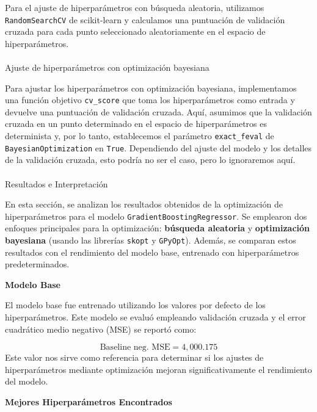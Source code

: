 \documentclass[
  12pt,
  letterpaper,
  DIV=11,
  numbers=noendperiod]{scrartcl}
\makeatletter
\let\oldparagraph\paragraph
\renewcommand{\paragraph}{
    \@ifstar
      \xxxParagraphStar
      \xxxParagraphNoStar
  }
\newcommand{\xxxParagraphStar}[1]{\oldparagraph*{#1}\mbox{}}
\newcommand{\xxxParagraphNoStar}[1]{\oldparagraph{#1}\mbox{}}
\makeatother
\begin{document}
Para el ajuste de hiperparámetros con búsqueda aleatoria, utilizamos
\texttt{RandomSearchCV} de scikit-learn y calculamos una puntuación de
validación cruzada para cada punto seleccionado aleatoriamente en el
espacio de hiperparámetros.

\paragraph{Ajuste de hiperparámetros con optimización
bayesiana}\label{ajuste-de-hiperparuxe1metros-con-optimizaciuxf3n-bayesiana}

Para ajustar los hiperparámetros con optimización bayesiana,
implementamos una función objetivo \texttt{cv\_score} que toma los
hiperparámetros como entrada y devuelve una puntuación de validación
cruzada. Aquí, asumimos que la validación cruzada en un punto
determinado en el espacio de hiperparámetros es determinista y, por lo
tanto, establecemos el parámetro \texttt{exact\_feval} de
\texttt{BayesianOptimization} en \texttt{True}. Dependiendo del ajuste
del modelo y los detalles de la validación cruzada, esto podría no ser
el caso, pero lo ignoraremos aquí.

\paragraph{Resultados e
Interpretación}\label{resultados-e-interpretaciuxf3n}

En esta sección, se analizan los resultados obtenidos de la optimización
de hiperparámetros para el modelo \texttt{GradientBoostingRegressor}. Se
emplearon dos enfoques principales para la optimización:
\textbf{búsqueda aleatoria} y \textbf{optimización bayesiana} (usando
las librerías \texttt{skopt} y \texttt{GPyOpt}). Además, se comparan
estos resultados con el rendimiento del modelo base, entrenado con
hiperparámetros predeterminados.

\textbf{Modelo Base}

El modelo base fue entrenado utilizando los valores por defecto de los
hiperparámetros. Este modelo se evaluó empleando validación cruzada y el
error cuadrático medio negativo (MSE) se reportó como:

\[
\text{Baseline neg. MSE} = 4,000.175
\] Este valor nos sirve como referencia para determinar si los ajustes
de hiperparámetros mediante optimización mejoran significativamente el
rendimiento del modelo.

\textbf{Mejores Hiperparámetros Encontrados}
\end{document}
